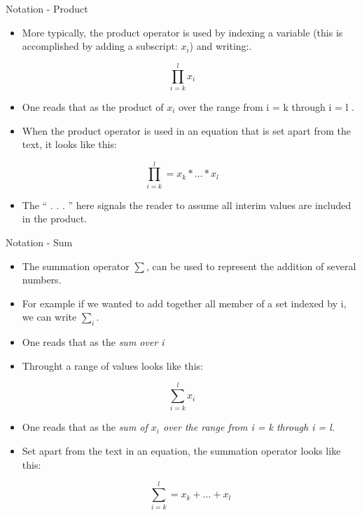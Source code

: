 \documentclass[
  ignorenonframetext,
]{beamer}
\providecommand{\tightlist}{%
  \setlength{\itemsep}{0pt}\setlength{\parskip}{0pt}}
\begin{document}
\begin{frame}{Notation - Product}
\protect\hypertarget{notation---product}{}

\begin{itemize}
\tightlist
\item
  More typically, the product operator is used by indexing a variable
  (this is accomplished by adding a subscript: \(x_{i}\)) and writing:.
\end{itemize}

\[\prod_{i = k}^{l} x_{i} \]

\begin{itemize}
\item
  One reads that as the product of \(x_{i}\) over the range from i = k
  through i = l .
\item
  When the product operator is used in an equation that is set apart
  from the text, it looks like this:
\end{itemize}

\[\prod_{i = k}^{l} = x_{k}   * \dots * x_{l}\]

\begin{itemize}
\tightlist
\item
  The `` . . . '' here signals the reader to assume all interim values
  are included in the product.
\end{itemize}

\end{frame}

\begin{frame}{Notation - Sum}
\protect\hypertarget{notation---sum}{}

\begin{itemize}
\item
  The summation operator \(\sum\), can be used to represent the addition
  of several numbers.
\item
  For example if we wanted to add together all member of a set indexed
  by i, we can write \(\sum_{i}\).
\item
  One reads that as the \emph{sum over i}
\item
  Throught a range of values looks like this:
\end{itemize}

\[\sum_{i=k}^{l}x_{i}\]

\begin{itemize}
\item
  One reads that as the \emph{sum of \(x_{i}\) over the range from i = k
  through i = l}.
\item
  Set apart from the text in an equation, the summation operator looks
  like this:

  \[\sum_{i = k}^{l} = x_{k}   + \dots + x_{l}\]
\end{itemize}

\end{frame}
\end{document}
